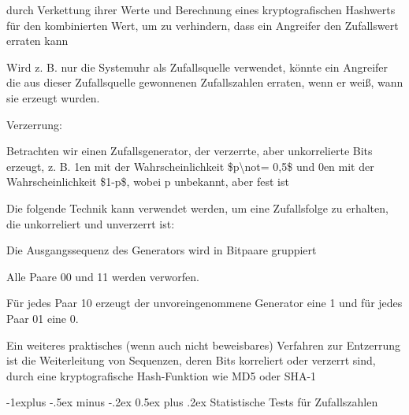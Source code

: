 \documentclass[a4paper]{article}
\makeatletter
\renewcommand{\subsection}{\@startsection{subsection}{2}{0mm}%
 {-1explus -.5ex minus -.2ex}%
 {0.5ex plus .2ex}%
 {\normalfont\normalsize\bfseries}}
\makeatother
\begin{document}
\begin{multicols}{3}
\begin{itemize*}
            durch Verkettung ihrer Werte und Berechnung eines kryptografischen
            Hashwerts für den kombinierten Wert, um zu verhindern, dass ein
            Angreifer den Zufallswert erraten kann
            \begin{itemize*}
                  \item Wird z. B. nur die Systemuhr als Zufallsquelle verwendet, könnte ein Angreifer die aus dieser Zufallsquelle gewonnenen Zufallszahlen erraten, wenn er weiß, wann sie erzeugt wurden.
            \end{itemize*}
            \item Verzerrung:
            \begin{itemize*}
                  \item Betrachten wir einen Zufallsgenerator, der verzerrte, aber unkorrelierte Bits erzeugt, z. B. 1en mit der Wahrscheinlichkeit \$p\textbackslash not= 0,5\$ und 0en mit der Wahrscheinlichkeit \$1-p\$, wobei p unbekannt, aber fest ist
            \end{itemize*}
            \item Die folgende Technik kann verwendet werden, um eine Zufallsfolge zu
            erhalten, die unkorreliert und unverzerrt ist:
            \begin{itemize*}
                  \item Die Ausgangssequenz des Generators wird in Bitpaare gruppiert
                  \item Alle Paare 00 und 11 werden verworfen.
                  \item Für jedes Paar 10 erzeugt der unvoreingenommene Generator eine 1 und für jedes Paar 01 eine 0.
            \end{itemize*}
            \item Ein weiteres praktisches (wenn auch nicht beweisbares) Verfahren zur
            Entzerrung ist die Weiterleitung von Sequenzen, deren Bits korreliert
            oder verzerrt sind, durch eine kryptografische Hash-Funktion wie MD5
            oder SHA-1
      \end{itemize*}


      \subsection{Statistische Tests für
            Zufallszahlen}


\end{multicols}
\end{document}
